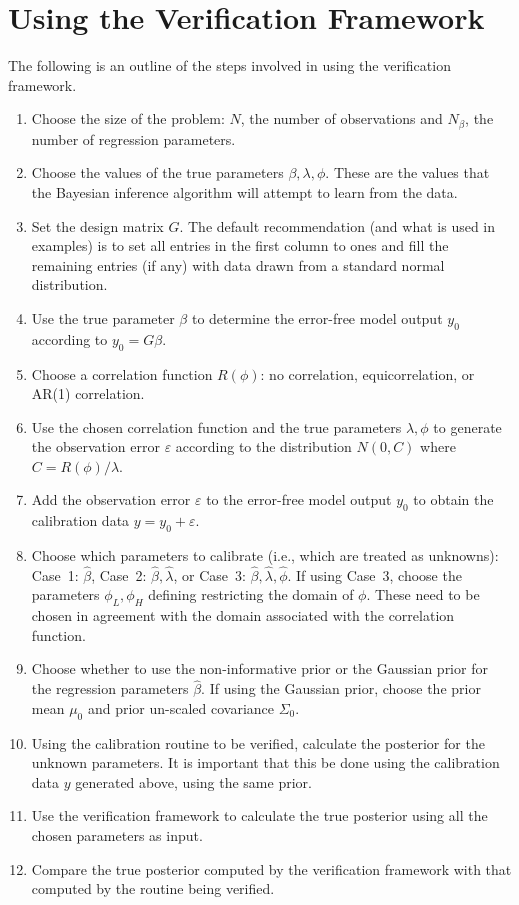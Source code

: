 \documentclass{book}
\begin{document}
\chapter{Using the Verification Framework}
The following is an outline of the steps involved in using the verification framework.
\begin{enumerate}
\item Choose the size of the problem: $N$, the number of observations and $N_\beta$, the number of
	regression parameters. 
\item Choose the values of the true parameters $\beta, \lambda, \phi$. These are the values that the Bayesian inference
	algorithm will attempt to learn from the data. 
\item Set the design matrix $G$. The default recommendation (and what is used in examples) is to set all entries in the first
	column to ones and fill the remaining entries (if any) with data drawn from a standard normal distribution.
\item Use the true parameter $\beta$ to determine the error-free model output $y_0$ according to $y_0 = G\beta$. 
\item Choose a correlation function $R(\phi)$: no correlation, equicorrelation, or AR(1) correlation. 
\item Use the chosen correlation function and the true parameters $\lambda, \phi$ to generate the observation error
	$\varepsilon$ according to the distribution $N(0, C)$ where $C = R(\phi) / \lambda$. 
\item Add the observation error $\varepsilon$ to the error-free model output $y_0$ to obtain the calibration data 
	$y = y_0 + \varepsilon$. 
\item Choose which parameters to calibrate (i.e., which are treated as unknowns): 
	Case~1: $\hat \beta$, 
	Case~2: $\hat\beta, \hat \lambda$, or
	Case~3: $\hat\beta, \hat \lambda, \hat \phi$. If using Case~3, choose the parameters $\phi_L, \phi_H$ defining
	restricting the domain of $\phi$. These need to be chosen in agreement with the domain associated with the
	correlation function. 
\item Choose whether to use the non-informative prior or the Gaussian prior for the regression parameters $\hat \beta$.
	If using the Gaussian prior, choose the prior mean $\mu_0$ and prior un-scaled covariance $\Sigma_0$.
\item Using the calibration routine to be verified, calculate the posterior for the unknown parameters. It is important that this 
	be done using the calibration data $y$ generated above, using the same prior.
\item Use the verification framework to calculate the true posterior using all the chosen parameters as input.
\item Compare the true posterior computed by the verification framework with that computed by the routine being verified.
\end{enumerate}
\end{document}
